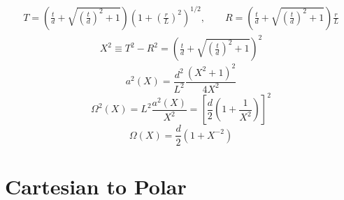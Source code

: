 \documentclass[10pt,letterpaper]{article}
\begin{document}
\begin{align}
T = \left(\frac{t}{d} + \sqrt{\left(\frac{t}{d}\right)^2 + 1}\right)\left( 1+ \left(\frac{r}{L}\right)^2\right)^{1/2},\qquad R =\left(\frac{t}{d} + \sqrt{\left(\frac{t}{d}\right)^2 + 1}\right)\frac{r}{L}
\end{align}
\begin{align}
X^2 \equiv T^2-R^2 =\left(\frac{t}{d} + \sqrt{\left(\frac{t}{d}\right)^2 + 1}\right)^2
\end{align}
\begin{equation}
a^2(X) = \frac{d^2}{L^2} \frac{(X^2+1)^2}{4X^2}
\end{equation}
\begin{equation}
\Omega^2(X) = L^2 \frac{a^2(X)}{X^2} = \left[ \frac{d}{2}\left( 1+ \frac{1}{X^2}\right)\right]^2
\end{equation}
\begin{equation}
\Omega(X) = \frac{d}{2}(1+X^{-2})
\end{equation}
\newpage
\section*{Cartesian to Polar}
\end{document}
